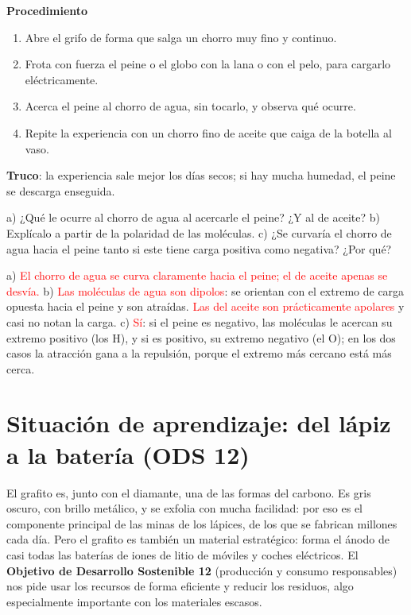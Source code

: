 \textbf{Procedimiento}
\begin{enumerate}[label=\numberballgreen]
    \item Abre el grifo de forma que salga un chorro muy fino y continuo.
    \item Frota con fuerza el peine o el globo con la lana o con el pelo, para cargarlo eléctricamente.
    \item Acerca el peine al chorro de agua, sin tocarlo, y observa qué ocurre.
    \item Repite la experiencia con un chorro fino de aceite que caiga de la botella al vaso.
\end{enumerate}
\textbf{Truco}: la experiencia sale mejor los días secos; si hay mucha humedad, el peine se descarga enseguida.

\begin{exercise}
    a) ¿Qué le ocurre al chorro de agua al acercarle el peine? ¿Y al de aceite? b) Explícalo a partir de la polaridad de las
    moléculas. c) ¿Se curvaría el chorro de agua hacia el peine tanto si este tiene carga positiva como negativa? ¿Por qué?
    \begin{solu}
        a) \textcolor{red}{El chorro de agua se curva claramente hacia el peine; el de aceite apenas se desvía.}
        b) \textcolor{red}{Las moléculas de agua son dipolos}: se orientan con el extremo de carga opuesta hacia el peine y son
        atraídas. \textcolor{red}{Las del aceite son prácticamente apolares} y casi no notan la carga. c) \textcolor{red}{Sí}: si el
        peine es negativo, las moléculas le acercan su extremo positivo (los H), y si es positivo, su extremo negativo (el O); en
        los dos casos la atracción gana a la repulsión, porque el extremo más cercano está más cerca.
    \end{solu}
\end{exercise}

\section{Situación de aprendizaje: del lápiz a la batería (ODS 12)}\label{sec:ud4-ods}

El grafito es, junto con el diamante, una de las formas del carbono. Es gris oscuro, con brillo metálico, y se exfolia con mucha
facilidad: por eso es el componente principal de las minas de los lápices, de los que se fabrican millones cada día. Pero el
grafito es también un material estratégico: forma el ánodo de casi todas las baterías de iones de litio de móviles y coches
eléctricos. El \textbf{Objetivo de Desarrollo Sostenible 12} (producción y consumo responsables) nos pide usar los recursos de
forma eficiente y reducir los residuos, algo especialmente importante con los materiales escasos.

